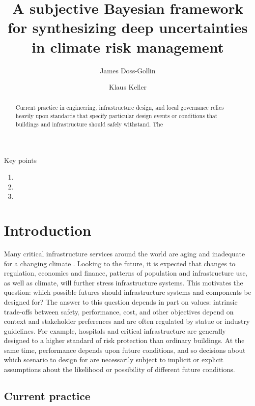 \documentclass[11pt]{article}
\title{A subjective Bayesian framework for synthesizing deep uncertainties in climate risk management}
\author[1]{James Doss-Gollin}
\author[2]{Klaus Keller}
\affil[1]{Department of Civil and Environmental Engineering, Rice University}
\affil[2]{Thayer School of Engineering, Dartmouth College}
\makeatletter
\DeclareRobustCommand\onedot{\futurelet\@let@token\@onedot}
\def\@onedot{\ifx\@let@token.\else.\null\fi\xspace}
\def\eg{\emph{e.g}\onedot} \def\Eg{\emph{E.g}\onedot}
\DeclareRobustCommand\onedot{\futurelet\@let@token\@onedot}
\def\@onedot{\ifx\@let@token.\else.\null\fi\xspace}
\def\eg{\emph{e.g}\onedot} \def\Eg{\emph{E.g}\onedot}
\makeatother
\begin{document}
\maketitle
\thispagestyle{empty}

\begin{abstract}
    Current practice in engineering, infrastructure design, and local governance relies heavily upon standards that specify particular design events or conditions that buildings and infrastructure should safely withstand.
    The
\end{abstract}

Key points
\begin{enumerate}
    \item
    \item
    \item
\end{enumerate}

\clearpage
\section{Introduction}\label{sec:introduction}

Many critical infrastructure services around the world are aging and inadequate for a changing climate \citep[\eg,][]{doss-gollin_txtreme:2021,doss-gollin_fatalism:2020,chester_reliable:2020}.
Looking to the future, it is expected that changes to regulation, economics and finance, patterns of population and infrastructure use, as well as climate, will further stress infrastructure systems.
This motivates the question: which possible futures should infrastructure systems and components be designed for?
The answer to this question depends in part on values: intrinsic trade-offs between safety, performance, cost, and other objectives depend on context and stakeholder preferences \citep{keller_management:2021} and are often regulated by statue or industry guidelines.
For example, hospitals and critical infrastructure are generally designed to a higher standard of risk protection than ordinary buildings.
At the same time, performance depends upon future conditions, and so decisions about which scenario to design for are necessarily subject to implicit or explicit assumptions about the likelihood or possibility of different future conditions.

\subsection{Current practice}
\end{document}
